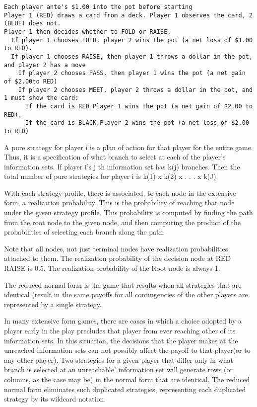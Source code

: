 \begin{helpglossary}
\label{pokergloss}
\begin{verbatim} 
Each player ante's $1.00 into the pot before starting
Player 1 (RED) draws a card from a deck. Player 1 observes the card, 2 (BLUE) does not. 
Player 1 then decides whether to FOLD or RAISE. 
  If player 1 chooses FOLD, player 2 wins the pot (a net loss of $1.00 to RED).
  If player 1 chooses RAISE, then player 1 throws a dollar in the pot, and player 2 has a move
    If player 2 chooses PASS, then player 1 wins the pot (a net gain of $2.00to RED)
    If player 2 chooses MEET, player 2 throws a dollar in the pot, and 1 must show the card: 
      If the card is RED Player 1 wins the pot (a net gain of $2.00 to RED).
      If the card is BLACK Player 2 wins the pot (a net loss of $2.00 to RED)
\end{verbatim}

\label{purestratgloss} 
A pure strategy for player i is a plan of action for that player for the 
entire game.  Thus, it is a specification of what branch to select at each 
of the player's information sets.  If player i's j th information set has 
k(j) branches.  Then the total number of pure strategies for player i is 
k(1) x k(2) x . . . x k(J).

\label{realprobgloss}
With each strategy profile, there is associated, to each node in the 
extensive form, a realization probability.  This is the probability of
 reaching that node under the given strategy profile.  This probability is 
computed by finding the path from the root node to the given node, and then 
computing the product of the probabilities of selecting each branch along 
the path.  

Note that all nodes, not just terminal nodes have realization probabilities
 attached to them.  The realization probability of the decision node at RED 
RAISE is 0.5.  The realization probability of the Root node is always 1.

\label{rednormgloss}
The reduced normal form is the game that results when all strategies that 
are identical (result in  the same payoffs for all contingencies of the 
other players are represented by a single strategy.  

In many extensive form games, there are cases in which a choice adopted by 
a player early in the play precludes that player from ever reaching other 
of its information sets.  In this situation, the decisions that the player 
makes at the unreached information sets can not possibly affect the  payoff
 to that player(or to any other player).  Two strategies for a given player
 that differ only in what branch is selected at an unreachable'  information
 set will generate rows (or columns, as the case may be) in the normal form 
that are identical.  The reduced normal form eliminates such duplicated 
strategies, representing each duplicated strategy by its wildcard notation.  


\end{helpglossary}
